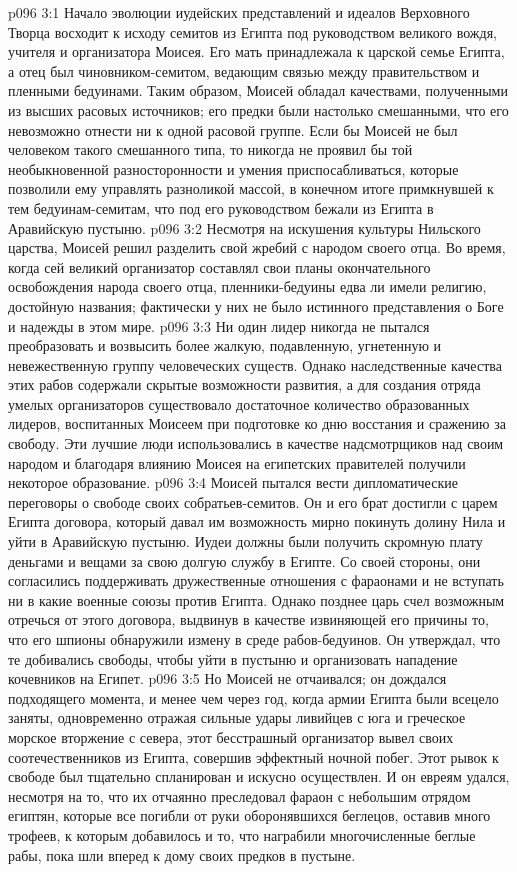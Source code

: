 \vs p096 3:1 Начало эволюции иудейских представлений и идеалов Верховного Творца восходит к исходу семитов из Египта под руководством великого вождя, учителя и организатора Моисея. Его мать принадлежала к царской семье Египта, а отец был чиновником\hyp{}семитом, ведающим связью между правительством и пленными бедуинами. Таким образом, Моисей обладал качествами, полученными из высших расовых источников; его предки были настолько смешанными, что его невозможно отнести ни к одной расовой группе. Если бы Моисей не был человеком такого смешанного типа, то никогда не проявил бы той необыкновенной разносторонности и умения приспосабливаться, которые позволили ему управлять разноликой массой, в конечном итоге примкнувшей к тем бедуинам\hyp{}семитам, что под его руководством бежали из Египта в Аравийскую пустыню.
\vs p096 3:2 Несмотря на искушения культуры Нильского царства, Моисей решил разделить свой жребий с народом своего отца. Во время, когда сей великий организатор составлял свои планы окончательного освобождения народа своего отца, пленники\hyp{}бедуины едва ли имели религию, достойную названия; фактически у них не было истинного представления о Боге и надежды в этом мире.
\vs p096 3:3 \pc Ни один лидер никогда не пытался преобразовать и возвысить более жалкую, подавленную, угнетенную и невежественную группу человеческих существ. Однако наследственные качества этих рабов содержали скрытые возможности развития, а для создания отряда умелых организаторов существовало достаточное количество образованных лидеров, воспитанных Моисеем при подготовке ко дню восстания и сражению за свободу. Эти лучшие люди использовались в качестве надсмотрщиков над своим народом и благодаря влиянию Моисея на египетских правителей получили некоторое образование.
\vs p096 3:4 Моисей пытался вести дипломатические переговоры о свободе своих собратьев\hyp{}семитов. Он и его брат достигли с царем Египта договора, который давал им возможность мирно покинуть долину Нила и уйти в Аравийскую пустыню. Иудеи должны были получить скромную плату деньгами и вещами за свою долгую службу в Египте. Со своей стороны, они согласились поддерживать дружественные отношения с фараонами и не вступать ни в какие военные союзы против Египта. Однако позднее царь счел возможным отречься от этого договора, выдвинув в качестве извиняющей его причины то, что его шпионы обнаружили измену в среде рабов\hyp{}бедуинов. Он утверждал, что те добивались свободы, чтобы уйти в пустыню и организовать нападение кочевников на Египет.
\vs p096 3:5 Но Моисей не отчаивался; он дождался подходящего момента, и менее чем через год, когда армии Египта были всецело заняты, одновременно отражая сильные удары ливийцев с юга и греческое морское вторжение с севера, этот бесстрашный организатор вывел своих соотечественников из Египта, совершив эффектный ночной побег. Этот рывок к свободе был тщательно спланирован и искусно осуществлен. И он евреям удался, несмотря на то, что их отчаянно преследовал фараон с небольшим отрядом египтян, которые все погибли от руки оборонявшихся беглецов, оставив много трофеев, к которым добавилось и то, что награбили многочисленные беглые рабы, пока шли вперед к дому своих предков в пустыне.
